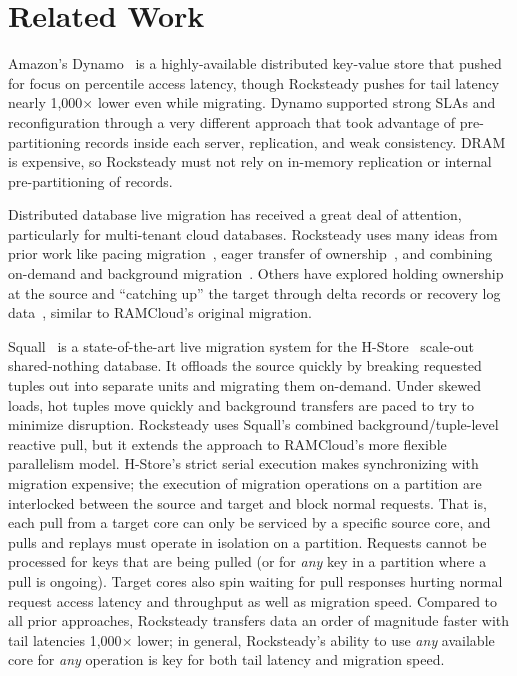 \section{Related Work}

Amazon's Dynamo~\cite{dynamo} is a highly-available distributed key-value store
that pushed for focus on \nnnth percentile access latency, though Rocksteady
pushes for tail latency nearly 1,000$\times$ lower even while migrating. Dynamo
supported strong SLAs and reconfiguration through a very different approach
that took advantage of pre-partitioning records inside each server, replication,
and weak consistency. DRAM is expensive, so Rocksteady must not rely on
in-memory replication or internal pre-partitioning of records.

Distributed database live migration has received a great deal of attention,
particularly for multi-tenant cloud databases. Rocksteady uses many ideas from
prior work like pacing migration~\cite{slacker}, eager transfer of
ownership~\cite{zephyr,squall}, and combining on-demand and background
migration~\cite{squall,zephyr,prorea}. Others have explored holding ownership
at the source and ``catching up'' the target through delta records or recovery
log data~\cite{albatross}, similar to RAMCloud's original migration.

Squall~\cite{squall,estore} is a state-of-the-art live migration system for the
H-Store~\cite{hstore} scale-out shared-nothing database. It offloads the source
quickly by breaking requested tuples out into separate units and migrating
them on-demand. Under skewed loads, hot tuples move quickly and background
transfers are paced to try to minimize disruption. Rocksteady uses Squall's
combined background/tuple-level reactive pull, but it extends the approach to
RAMCloud's more flexible parallelism model.
H-Store's strict serial execution makes synchronizing with migration expensive;
the execution of migration operations on a partition
are interlocked between the source and target and block normal
requests.  That is, each pull from a target core can only be serviced by a
specific source core, and pulls and replays must operate in
isolation on a partition. Requests cannot be processed for keys that are
being pulled (or for {\em any} key in a partition where a pull is ongoing).
Target cores also spin waiting for pull responses hurting normal
request access latency and throughput as well as migration speed.
Compared to all prior approaches, Rocksteady transfers data an order of
magnitude faster with tail latencies 1,000$\times$ lower; in general,
Rocksteady's ability to use {\em any} available core for {\em any} operation is
key for both tail latency and migration speed.


